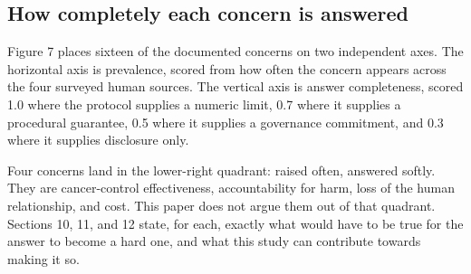 \subsection{How completely each concern is answered}

Figure 7 places sixteen of the documented concerns on two independent axes. The
horizontal axis is prevalence, scored from how often the concern appears across
the four surveyed human sources. The vertical axis is answer completeness,
scored 1.0 where the protocol supplies a numeric limit, 0.7 where it supplies a
procedural guarantee, 0.5 where it supplies a governance commitment, and 0.3
where it supplies disclosure only.

Four concerns land in the lower-right quadrant: raised often, answered softly.
They are cancer-control effectiveness, accountability for harm, loss of the
human relationship, and cost. This paper does not argue them out of that
quadrant. Sections 10, 11, and 12 state, for each, exactly what would have to be
true for the answer to become a hard one, and what this study can contribute
towards making it so.

